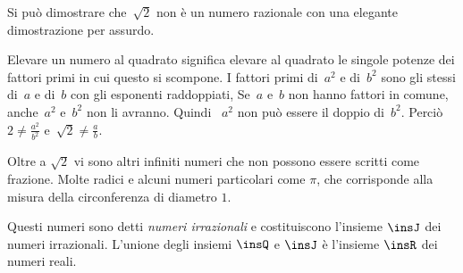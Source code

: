 Si può dimostrare che~$\sqrt{2}$ non è un numero razionale con una elegante 
dimostrazione per assurdo. 


Elevare un numero al quadrato significa elevare al quadrato le
singole potenze dei fattori primi in cui questo si scompone. I fattori
primi di~$a^{2}$ e di~$b^{2}$ sono gli stessi di~$a$ e di~$b$ con
gli esponenti raddoppiati, Se~$a$ e~$b$ non hanno fattori in comune, 
anche~$a^{2}$ e~$b^{2}$ non li avranno. Quindi ~$a^{2}$ non può essere il 
doppio di~$b^{2}$.
Perciò~$2\ne\frac{a^{2}}{b^{2}}$ e~$\sqrt{2}\ne\frac{a}{b}$.

Oltre a $\sqrt{2}$ vi sono altri infiniti numeri che non possono essere scritti 
come frazione. Molte radici e alcuni numeri particolari come $\pi$, 
che corrisponde alla misura della circonferenza di diametro $1$.

Questi numeri sono detti \emph{numeri irrazionali} e costituiscono l'insieme 
$\insJ$ dei numeri irrazionali.
L'unione degli insiemi $\insQ$ e $\insJ$ è l'insieme $\insR$ dei numeri reali.


